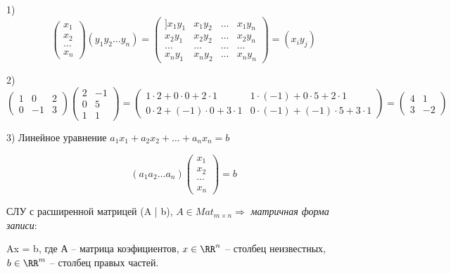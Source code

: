 1) \begin{equation*} \begin{pmatrix} x_1 \\ x_2 \\ \dots \\ x_n \end{pmatrix} (y_1 y_2 \dots y_n) = \begin{pmatrix}]
x_1 y_1 & x_1 y_2 & \dots & x_1 y_n \\
x_2 y_1 & x_2 y_2 & \dots & x_2 y_n \\
\dots & \dots & \dots & \dots \\
x_n y_1 & x_n y_2 & \dots & x_n y_n
\end{pmatrix} = (x_i y_j) \end{equation*}

2) \begin{equation*}\begin{pmatrix}
1 & 0 & 2 \\
0 & -1 & 3
\end{pmatrix} \begin{pmatrix}
2 & -1 \\
0 & 5 \\
1 & 1
\end{pmatrix} = \begin{pmatrix}
1 \cdot 2 + 0 \cdot 0 + 2 \cdot 1 & 1 \cdot (-1) + 0 \cdot 5 + 2 \cdot 1 \\
0 \cdot 2 + (-1) \cdot 0 + 3 \cdot 1 & 0 \cdot (-1) + (-1) \cdot 5 + 3 \cdot 1 \end{pmatrix} = \begin{pmatrix}
4 & 1 \\
3 & -2 \end{pmatrix} \end{equation*}

3) Линейное уравнение $a_1 x_1 + a_2 x_2 + \dots + a_n x_n = b$

\begin{equation*}(a_1 a_2 \dots a_n) \begin{pmatrix}
    x_1 \\
    x_2 \\
    \cdots \\
   x_n
	\end{pmatrix} = b
\end{equation*}

СЛУ с расширенной матрицей (A | b), $A \in Mat_{m \times n}
\Rightarrow$ \textit{матричная форма записи}:

Ax = b, где А -- матрица коэфициентов, $x \in \RR^n$ -- столбец неизвестных, $b \in \RR^m$ -- столбец правых частей.

